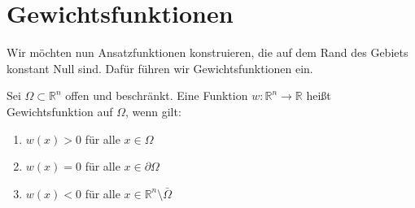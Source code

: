 \section{Gewichtsfunktionen}
Wir möchten nun Ansatzfunktionen konstruieren, die auf dem Rand des Gebiets konstant Null sind. Dafür führen wir Gewichtsfunktionen ein.
\begin{definition}
Sei $\Omega \subset \mathbb{R}^n$ offen und beschränkt. Eine Funktion $w:\mathbb{R}^n \rightarrow \mathbb{R}$ heißt Gewichtsfunktion auf $\Omega$, wenn gilt:
\begin{enumerate}
\item $w(x) > 0$ für alle $x \in \Omega$
\item $w(x) = 0$ für alle $x \in \partial \Omega$
\item $w(x) < 0$ für alle $x \in \mathbb{R}^n \setminus \bar{\Omega}$
\end{enumerate}
\end{definition}

